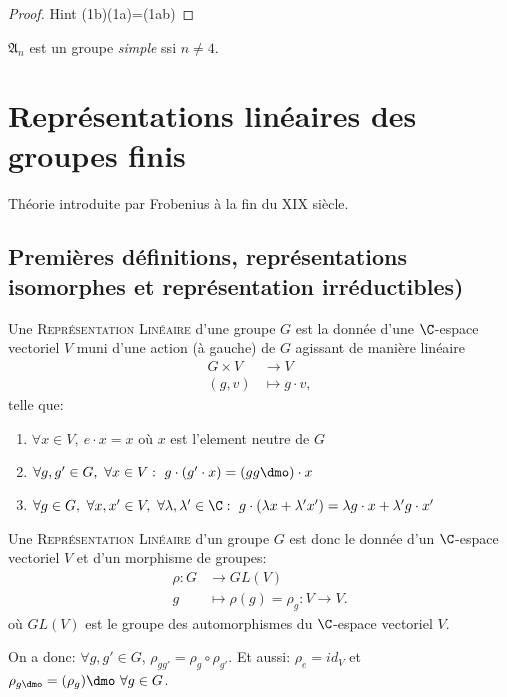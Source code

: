 \begin{proof}
	Hint (1b)(1a)=(1ab)
\end{proof}

\begin{theorem}[Galois]
	$\mathfrak{A}_n$ est un groupe \emph{simple} ssi $n \neq 4$.
\end{theorem}

\chapter{Représentations linéaires des groupes finis}

Théorie introduite par Frobenius à la fin du XIX siècle.

\section{Premières définitions, représentations isomorphes et représentation irréductibles)}

\begin{definition}
	Une \textsc{Représentation Linéaire} d'une groupe $G$ est la donnée d'une $\C$-espace vectoriel $V$ muni d'une action (à gauche) de $G$ agissant de manière linéaire
	\begin{align*}
		G\times V & \rightarrow V \\
		(g,v) & \mapsto g\cdot v,		
	\end{align*}
	telle que:
	\begin{enumerate}
		\item $\forall x\in V,\ e\cdot x=x$ où $x$ est l'element neutre de $G$
		\item $\forall g, g' \in G,\ \forall x\in V:\ g\cdot (g'\cdot x)=(gg\dmo)\cdot x$
		\item $\forall g\in G,\ \forall x,x'\in V,\ \forall \lambda,\lambda'\in\C:\ g\cdot(\lambda x+\lambda'x')=\lambda g\cdot x+\lambda' g\cdot x'$
	\end{enumerate}
\end{definition}

\begin{definition}
Une \textsc{Représentation Linéaire} d'un groupe $G$ est donc le donnée d'un $\C$-espace vectoriel $V$ et d'un morphisme de groupes:
\begin{align*}
	\rho:G &\rightarrow GL(V)\\
	g &\mapsto \rho(g)=\rho_g:V\rightarrow V.	
\end{align*}                
où $GL(V)$ est le groupe des automorphismes du $\C$-espace vectoriel $V$.

On a donc: $\forall g,g'\in G$, $\rho_{gg'}=\rho_g\circ \rho_{g'}$. Et aussi: $\rho_e=id_V$ et $\rho_{g\dmo}=(\rho_g)\dmo\ \forall g\in G$.
\end{definition}

